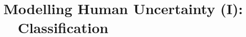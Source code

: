 %
%
%
%

%
%
%
%
%
%
%
%
%
%
%
%
%
%
%


\chapter{Modelling Human Uncertainty (I): \,\,\,\, Classification} \label{chapter:humanuncertainty}

